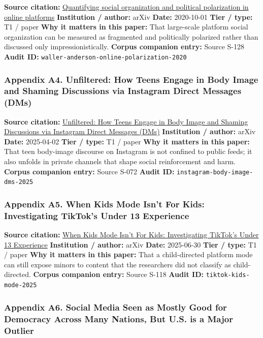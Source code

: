 \documentclass[
  american,
  11pt,
  letterpaper,
]{article}
\begin{document}
\textbf{Source citation:}
\href{https://arxiv.org/abs/2010.00590}{Quantifying social organization
and political polarization in online platforms} \textbf{Institution /
author:} arXiv \textbf{Date:} 2020-10-01 \textbf{Tier / type:} T1 /
paper \textbf{Why it matters in this paper:} That large-scale platform
social organization can be measured as fragmented and politically
polarized rather than discussed only impressionistically. \textbf{Corpus
companion entry:} Source S-128 \textbf{Audit ID:}
\texttt{waller-anderson-online-polarization-2020}

\subsubsection{Appendix A4. Unfiltered: How Teens Engage in Body Image
and Shaming Discussions via Instagram Direct Messages
(DMs)}\label{ch-02-appendix-a4-unfiltered-how-teens-engage-in-body-image-and-shaming-discussions-via-instagram-direct-messages-dms}

\textbf{Source citation:}
\href{https://arxiv.org/abs/2504.02176}{Unfiltered: How Teens Engage in
Body Image and Shaming Discussions via Instagram Direct Messages (DMs)}
\textbf{Institution / author:} arXiv \textbf{Date:} 2025-04-02
\textbf{Tier / type:} T1 / paper \textbf{Why it matters in this paper:}
That teen body-image discourse on Instagram is not confined to public
feeds; it also unfolds in private channels that shape social
reinforcement and harm. \textbf{Corpus companion entry:} Source S-072
\textbf{Audit ID:} \texttt{instagram-body-image-dms-2025}

\subsubsection{Appendix A5. When Kids Mode Isn't For Kids: Investigating
TikTok's Under 13
Experience}\label{ch-02-appendix-a5-when-kids-mode-isn-t-for-kids-investigating-tiktok-s-under-13-experience}

\textbf{Source citation:} \href{https://arxiv.org/abs/2507.00299}{When
Kids Mode Isn't For Kids: Investigating TikTok's Under 13 Experience}
\textbf{Institution / author:} arXiv \textbf{Date:} 2025-06-30
\textbf{Tier / type:} T1 / paper \textbf{Why it matters in this paper:}
That a child-directed platform mode can still expose minors to content
that the researchers did not classify as child-directed. \textbf{Corpus
companion entry:} Source S-118 \textbf{Audit ID:}
\texttt{tiktok-kids-mode-2025}

\subsubsection{Appendix A6. Social Media Seen as Mostly Good for
Democracy Across Many Nations, But U.S. is a Major
Outlier}\label{ch-02-appendix-a6-social-media-seen-as-mostly-good-for-democracy-across-many-nations-but-u-s-is-a-major-outlier}
\end{document}

